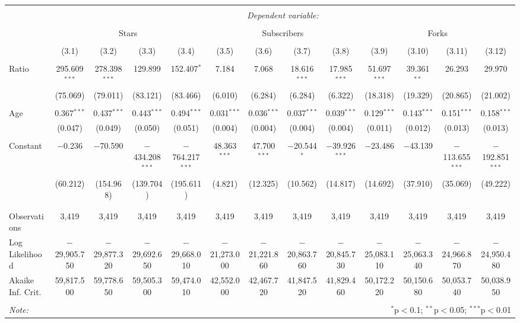 
\begin{tabular}{@{\extracolsep{5pt}}lcccccccccccc}
\\[-1.8ex]\hline
\hline \\[-1.8ex]
 & \multicolumn{12}{c}{\textit{Dependent variable:}} \\
\cline{2-13}
\\[-1.8ex] & \multicolumn{4}{c}{Stars} & \multicolumn{4}{c}{Subscribers} & \multicolumn{4}{c}{Forks} \\
\\[-1.8ex] & (3.1) & (3.2) & (3.3) & (3.4) & (3.5) & (3.6) & (3.7) & (3.8) & (3.9) & (3.10) & (3.11) & (3.12)\\
\hline \\[-1.8ex]
 Ratio & 295.609$^{***}$ & 278.398$^{***}$ & 129.899 & 152.407$^{*}$ & 7.184 & 7.068 & 18.616$^{***}$ & 17.985$^{***}$ & 51.697$^{***}$ & 39.361$^{**}$ & 26.293 & 29.970 \\
  & (75.069) & (79.011) & (83.121) & (83.466) & (6.010) & (6.284) & (6.284) & (6.322) & (18.318) & (19.329) & (20.865) & (21.002) \\
  & & & & & & & & & & & & \\
 Age & 0.367$^{***}$ & 0.437$^{***}$ & 0.443$^{***}$ & 0.494$^{***}$ & 0.031$^{***}$ & 0.036$^{***}$ & 0.037$^{***}$ & 0.039$^{***}$ & 0.129$^{***}$ & 0.143$^{***}$ & 0.151$^{***}$ & 0.158$^{***}$ \\
  & (0.047) & (0.049) & (0.050) & (0.051) & (0.004) & (0.004) & (0.004) & (0.004) & (0.011) & (0.012) & (0.013) & (0.013) \\
  & & & & & & & & & & & & \\
 Constant & $-$0.236 & $-$70.590 & $-$434.208$^{***}$ & $-$764.217$^{***}$ & 48.363$^{***}$ & 47.700$^{***}$ & $-$20.544$^{*}$ & $-$39.926$^{***}$ & $-$23.486 & $-$43.139 & $-$113.655$^{***}$ & $-$192.851$^{***}$ \\
  & (60.212) & (154.968) & (139.704) & (195.611) & (4.821) & (12.325) & (10.562) & (14.817) & (14.692) & (37.910) & (35.069) & (49.222) \\
  & & & & & & & & & & & & \\
\hline \\[-1.8ex]
Observations & 3,419 & 3,419 & 3,419 & 3,419 & 3,419 & 3,419 & 3,419 & 3,419 & 3,419 & 3,419 & 3,419 & 3,419 \\
Log Likelihood & $-$29,905.750 & $-$29,877.320 & $-$29,692.650 & $-$29,668.010 & $-$21,273.000 & $-$21,221.860 & $-$20,863.760 & $-$20,845.730 & $-$25,083.110 & $-$25,063.340 & $-$24,966.870 & $-$24,950.480 \\
Akaike Inf. Crit. & 59,817.500 & 59,778.650 & 59,505.300 & 59,474.010 & 42,552.000 & 42,467.720 & 41,847.520 & 41,829.460 & 50,172.220 & 50,150.680 & 50,053.740 & 50,038.950 \\
\hline
\hline \\[-1.8ex]
\textit{Note:}  & \multicolumn{12}{r}{$^{*}$p$<$0.1; $^{**}$p$<$0.05; $^{***}$p$<$0.01} \\
\end{tabular}
